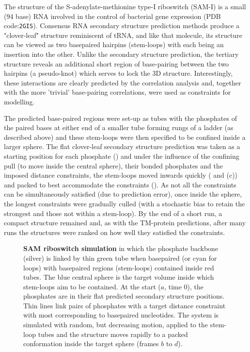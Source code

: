The structure of the S-adenylate-methionine type-I riboswitch (SAM-I) is a small (94 base) RNA involved
in the control of bacterial gene expression (PDB code:{\tt 2GIS}).   Consensus RNA secondary structure
prediction methods produce a "clover-leaf" structure reminiscent of tRNA, and like that molecule, its
structure can be viewed as two basepaired hairpins (stem-loops) with each being an insertion into the
other.  Unlike the secondary structure prediction, the tertiary structure reveals an additional
short region of base-pairing between the two hairpins (a pseudo-knot) which serves
to lock the 3D structure.   Interestingly, these interactions are clearly predicted
by the correlation analysis and, together with the more 'trivial' base-pairing
correlations, were used as constraints for modelling.

The predicted base-paired regions were set-up as tubes with the phosphates of the paired bases
at either end of a smaller tube forming rungs of a ladder (as described above) and these stem-loops
were then specified to be confined inside a larger sphere.    The flat clover-leaf secondary structure
prediction was taken as a starting position for each phosphate () and under the
influence of the confining pull (to move inside the central sphere), their bonded phosphates
and the imposed distance constraints, the stem-loops moved inwards quickly ( and (c))
and packed to best accommodate the constraints ().    As not all the constraints can be
simultaneously satisfied (due to prediction error), once inside the sphere,
the longest constraints were gradually culled (with a stochastic bias to retain the
strongest and those not within a stem-loop).   By the end of a short run, a compact
structure remained and, as with the TM-protein predictions, after many runs the structures
were ranked on how well they satisfied the constraints.

\begin{figure}
\centering
{}
\caption{
\label{Fig:myo2DFS}
{\bf SAM riboswitch simulation} in which the phosphate backbone (silver) is linked by
thin green tube when basepaired (or cyan for loops) with basepaired regions (stem-loops)
contained inside red tubes.  The blue central sphere is the target volume inside which
stem-loops aim to be contained.   At the start ($a$, time 0), the phosphates are in their
flat predicted secondary structure positions.   Thin lines link pairs of phosphates with
a target distance constraint with most corresponding to basepaired nucleotides.
The system is simulated with random, but decreasing motion, applied to the stem-loop tubes
and the structure moves rapidly to a packed conformation inside the target sphere
(frames $b$ to $d$).    
}
\end{figure}

